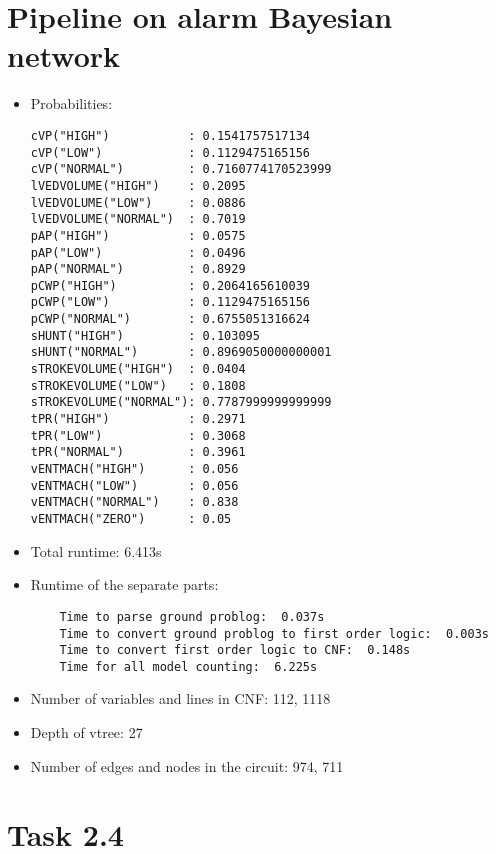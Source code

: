 \section{Pipeline on alarm Bayesian network}
\begin{itemize}
    \item Probabilities:
    \begin{lstlisting}
cVP("HIGH")           : 0.1541757517134
cVP("LOW")            : 0.1129475165156
cVP("NORMAL")         : 0.7160774170523999
lVEDVOLUME("HIGH")    : 0.2095
lVEDVOLUME("LOW")     : 0.0886
lVEDVOLUME("NORMAL")  : 0.7019
pAP("HIGH")           : 0.0575
pAP("LOW")            : 0.0496
pAP("NORMAL")         : 0.8929
pCWP("HIGH")          : 0.2064165610039
pCWP("LOW")           : 0.1129475165156
pCWP("NORMAL")        : 0.6755051316624
sHUNT("HIGH")         : 0.103095
sHUNT("NORMAL")       : 0.8969050000000001
sTROKEVOLUME("HIGH")  : 0.0404
sTROKEVOLUME("LOW")   : 0.1808
sTROKEVOLUME("NORMAL"): 0.7787999999999999
tPR("HIGH")           : 0.2971
tPR("LOW")            : 0.3068
tPR("NORMAL")         : 0.3961
vENTMACH("HIGH")      : 0.056
vENTMACH("LOW")       : 0.056
vENTMACH("NORMAL")    : 0.838
vENTMACH("ZERO")      : 0.05
    \end{lstlisting}
    \item Total runtime: 6.413s
    \item Runtime of the separate parts:
    \begin{lstlisting}
    Time to parse ground problog:  0.037s
    Time to convert ground problog to first order logic:  0.003s
    Time to convert first order logic to CNF:  0.148s
    Time for all model counting:  6.225s
    \end{lstlisting}
    \item Number of variables and lines in CNF: 112, 1118
    \item Depth of vtree: 27
    \item Number of edges and nodes in the circuit: 974, 711
\end{itemize}

\section{Task 2.4}
